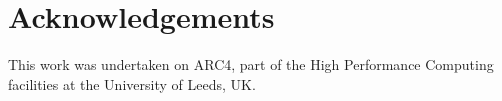 \section{Acknowledgements}


This work was undertaken on ARC4, part of the High Performance Computing facilities at the University of Leeds, UK.